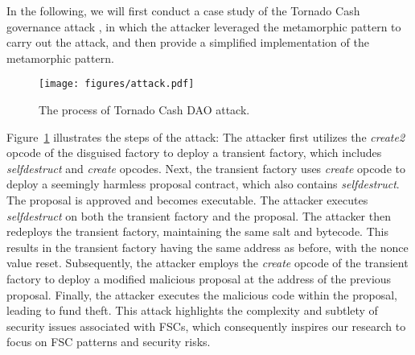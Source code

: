 \documentclass[acmsmall,screen]{acmart}
\begin{document}
	In the following, we will first conduct a case study of the Tornado Cash governance attack \cite{tornado-cash-attack}, in which the attacker leveraged the metamorphic pattern to carry out the attack, and then provide a simplified implementation of the metamorphic pattern.

	\begin{figure}[h]
		\centering
		\texttt{[image: figures/attack.pdf]}
		\caption{The process of Tornado Cash DAO attack.}
		\label{fig:tornado_attack}
	\end{figure}


	Figure~\ref{fig:tornado_attack} illustrates the steps of the attack:  The attacker first utilizes the \textit{create2} opcode of the disguised factory to deploy a transient factory, which includes \textit{selfdestruct} and \textit{create} opcodes.  Next, the transient factory uses \textit{create} opcode to deploy a seemingly harmless proposal contract, which also contains \textit{selfdestruct}.  The proposal is approved and becomes executable.  The attacker executes \textit{selfdestruct} on both the transient factory and the proposal.  The attacker then redeploys the transient factory, maintaining the same salt and bytecode. This results in the transient factory having the same address as before, with the nonce value reset.  Subsequently, the attacker employs the \textit{create} opcode of the transient factory to deploy a modified malicious proposal at the address of the previous proposal.  Finally, the attacker executes the malicious code within the proposal, leading to fund theft. This attack highlights the complexity and subtlety of security issues associated with FSCs, which consequently inspires our research to focus on FSC patterns and security risks.
\end{document}
